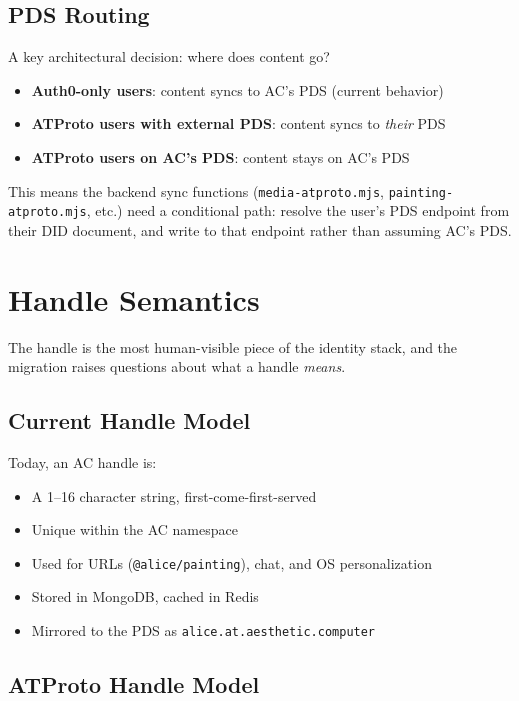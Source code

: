 \documentclass[10pt,letterpaper,twocolumn]{article}
\begin{document}
\subsection{PDS Routing}

A key architectural decision: where does content go?

\begin{itemize}
  \item \textbf{Auth0-only users}: content syncs to AC's PDS (current behavior)
  \item \textbf{ATProto users with external PDS}: content syncs to \emph{their} PDS
  \item \textbf{ATProto users on AC's PDS}: content stays on AC's PDS
\end{itemize}

This means the backend sync functions (\texttt{media-atproto.mjs}, \texttt{painting-atproto.mjs}, etc.) need a conditional path: resolve the user's PDS endpoint from their DID document, and write to that endpoint rather than assuming AC's PDS.


\section{Handle Semantics}
\label{sec:handles}

The handle is the most human-visible piece of the identity stack, and the migration raises questions about what a handle \emph{means}.

\subsection{Current Handle Model}

Today, an AC handle is:
\begin{itemize}
  \item A 1--16 character string, first-come-first-served
  \item Unique within the AC namespace
  \item Used for URLs (\texttt{@alice/painting}), chat, and OS personalization
  \item Stored in MongoDB, cached in Redis
  \item Mirrored to the PDS as \texttt{alice.at.aesthetic.computer}
\end{itemize}

\subsection{ATProto Handle Model}
\end{document}
